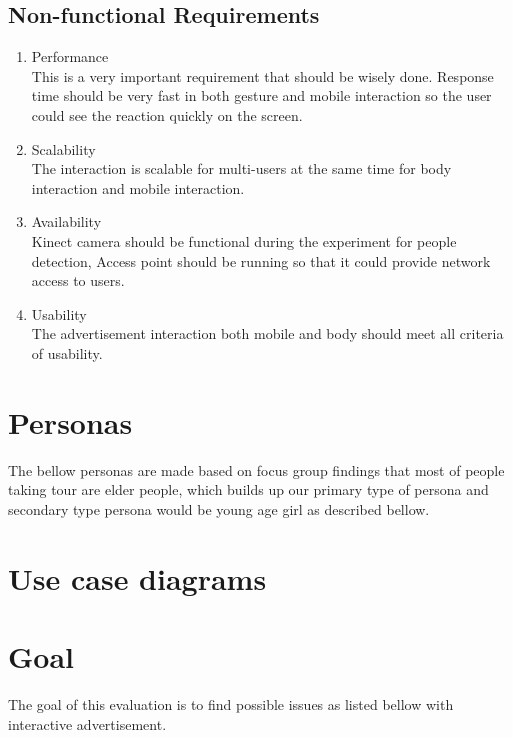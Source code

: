 \subsection{Non-functional Requirements}

\begin{enumerate}
\item	Performance \\
This is a very important requirement that should be wisely done. Response time should be very fast in both gesture and mobile interaction so the user could see the reaction quickly on the screen. 

\item	Scalability \\
The interaction is scalable for multi-users at the same time for body interaction and mobile interaction.

\item	Availability \\
Kinect camera should be functional during the experiment for people detection, Access point should be running so that it could provide network access to users.

\item	Usability \\
The advertisement interaction both mobile and body should meet all criteria of usability.
\end{enumerate}

\section{Personas}
The bellow personas are made based on focus group findings that most of people taking tour are elder people, which builds up our primary type of persona and secondary type persona would be young age girl as described bellow.







\section{Use case diagrams}





\section{Goal}
The goal of this evaluation is to find possible issues as listed bellow with interactive advertisement. 

